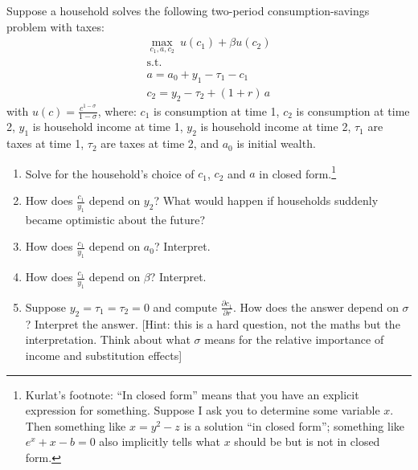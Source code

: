 \noindent Suppose a household solves the following two-period consumption-savings problem with taxes:
\begin{gather*}
\max_{c_1,a,c_2}\ u(c_1)+\beta u(c_2)\\
\text{s.t.}\\
a=a_0+y_1-\tau_1-c_1\\
c_2=y_2-\tau_2+(1+r)\,a
\end{gather*}
with $u(c)=\frac{c^{1-\sigma}}{1-\sigma}$, where: $c_1$ is consumption at time 1, $c_2$ is consumption at time 2, $y_1$ is household income
at time 1, $y_2$ is household income at time 2, $\tau_1$ are taxes at time 1, $\tau_2$ are taxes at time 2, and $a_0$ is initial wealth.
\begin{enumerate}[label=(\alph*),leftmargin=2.2em,topsep=2pt,itemsep=1pt]
\item Solve for the household's choice of $c_1$, $c_2$ and $a$ in closed form.\footnote{Kurlat's footnote: ``In closed form'' means
that you have an explicit expression for something. Suppose I ask you to determine some variable $x$. Then something like
$x=y^2-z$ is a solution ``in closed form''; something like $e^x+x-b=0$ also implicitly tells what $x$ should be but is not in closed form.}
\item How does $\frac{c_1}{y_1}$ depend on $y_2$? What would happen if households suddenly became optimistic about the future?
\item How does $\frac{c_1}{y_1}$ depend on $a_0$? Interpret.
\item How does $\frac{c_1}{y_1}$ depend on $\beta$? Interpret.
\item Suppose $y_2=\tau_1=\tau_2=0$ and compute $\frac{\partial c_1}{\partial r}$. How does the answer depend on $\sigma$? Interpret the
answer. [Hint: this is a hard question, not the maths but the interpretation. Think about what $\sigma$ means for the relative
importance of income and substitution effects]
\end{enumerate}
\resolespaco
